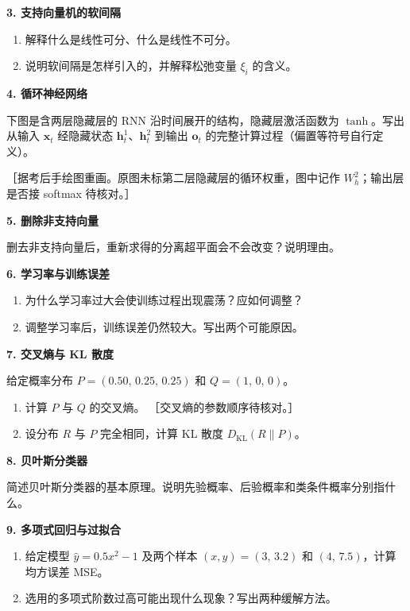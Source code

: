 \documentclass[zihao=-4,a4paper,fontset=windows]{ctexart}
\newcommand{\pending}[1]{{\zihao{5}［#1］}}
\newcommand{\problem}[1]{\par\addvspace{\medskipamount}\needspace{4\baselineskip}\noindent\textbf{#1}\par\nopagebreak}
\begin{document}
\problem{3. 支持向量机的软间隔}
\begin{enumerate}[label=(\arabic*)]
\item 解释什么是线性可分、什么是线性不可分。
\item 说明软间隔是怎样引入的，并解释松弛变量 \(\xi_i\) 的含义。
\end{enumerate}

\problem{4. 循环神经网络}
下图是含两层隐藏层的 RNN 沿时间展开的结构，隐藏层激活函数为 \(\tanh\)。写出从输入 \(\bm x_t\) 经隐藏状态 \(\bm h_t^{1}\)、\(\bm h_t^{2}\) 到输出 \(\bm o_t\) 的完整计算过程（偏置等符号自行定义）。
\begin{center}
\end{center}
\pending{据考后手绘图重画。原图未标第二层隐藏层的循环权重，图中记作 \(W_h^{2}\)；输出层是否接 softmax 待核对。}

\problem{5. 删除非支持向量}
删去非支持向量后，重新求得的分离超平面会不会改变？说明理由。

\problem{6. 学习率与训练误差}
\begin{enumerate}[label=(\arabic*)]
\item 为什么学习率过大会使训练过程出现震荡？应如何调整？
\item 调整学习率后，训练误差仍然较大。写出两个可能原因。
\end{enumerate}

\problem{7. 交叉熵与 KL 散度}
给定概率分布 \(P=(0.50,\,0.25,\,0.25)\) 和 \(Q=(1,\,0,\,0)\)。
\begin{enumerate}[label=(\arabic*)]
\item 计算 \(P\) 与 \(Q\) 的交叉熵。 \pending{交叉熵的参数顺序待核对。}
\item 设分布 \(R\) 与 \(P\) 完全相同，计算 KL 散度 \(D_{\mathrm{KL}}(R\|P)\)。
\end{enumerate}

\problem{8. 贝叶斯分类器}
简述贝叶斯分类器的基本原理。说明先验概率、后验概率和类条件概率分别指什么。

\problem{9. 多项式回归与过拟合}
\begin{enumerate}[label=(\arabic*)]
\item 给定模型 \(\hat y=0.5x^2-1\) 及两个样本 \((x,y)=(3,\,3.2)\) 和 \((4,\,7.5)\)，计算均方误差 MSE。
\item 选用的多项式阶数过高可能出现什么现象？写出两种缓解方法。
\end{enumerate}
\end{document}
